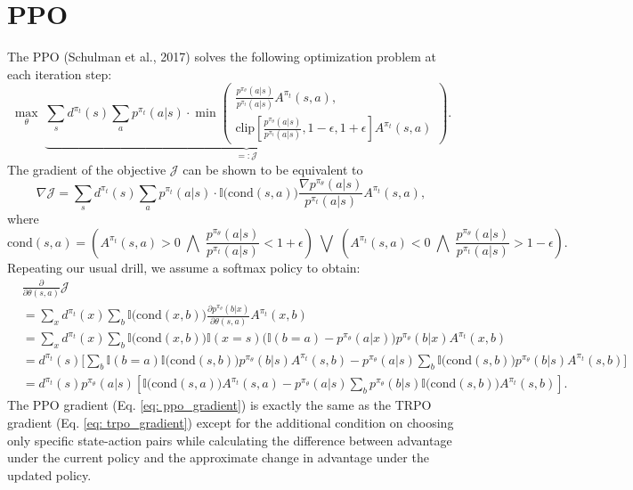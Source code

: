 \documentclass[a4paper, 10pt]{article}
\begin{document}
\section{PPO}
The PPO (Schulman et al., 2017) solves the following optimization problem at each iteration step:
\begin{equation}
  \max_\theta \; \underbrace{\sum_s d^{\pi_t}(s) \sum_a p^{\pi_t}(a | s) \cdot \min \left( \begin{matrix} \frac{p^{\pi_\theta}(a | s)}{p^{\pi_t}(a | s)} A^{\pi_t}(s, a), \\ \text{clip} \left[\frac{p^{\pi_\theta}(a | s)}{p^{\pi_t}(a | s)}, 1 - \epsilon, 1 + \epsilon \right] A^{\pi_t}(s, a) \end{matrix} \right)}_{=: \mathcal{J}}.
\end{equation}
The gradient of the objective $\mathcal{J}$ can be shown to be equivalent to
\begin{equation}
  \nabla \mathcal{J} = \sum_s d^{\pi_t}(s) \sum_a p^{\pi_t}(a | s) \cdot \mathbb{I} \Big( \text{cond}(s, a) \Big) \frac{\nabla p^{\pi_\theta}(a | s)}{p^{\pi_t}(a | s)} A^{\pi_t}(s, a),
\end{equation}
where 
\begin{equation}
  \text{cond}(s, a) = \left( A^{\pi_t}(s, a) > 0 \;\bigwedge\; \frac{p^{\pi_\theta}(a | s)}{p^{\pi_t}(a | s)} < 1 + \epsilon \right) \;\bigvee\; \left( A^{\pi_t}(s, a) < 0 \;\bigwedge\; \frac{p^{\pi_\theta}(a | s)}{p^{\pi_t}(a | s)} > 1 - \epsilon \right).
\end{equation}
Repeating our usual drill, we assume a softmax policy to obtain:
\begin{align}
  & \frac{\partial}{\partial \theta(s, a)} \mathcal{J} \nonumber \\
  &= \sum_x d^{\pi_t}(x) \sum_b \mathbb{I} \Big( \text{cond}(x, b) \Big) \frac{\partial p^{\pi_\theta}(b | x)}{\partial \theta(s, a)} A^{\pi_t}(x, b) \nonumber \\
  &= \sum_x d^{\pi_t}(x) \sum_b \mathbb{I} \Big( \text{cond}(x, b) \Big) \mathbb{I}(x = s) \Big( \mathbb{I}(b = a) - p^{\pi_\theta}(a | x) \Big) p^{\pi_\theta}(b | x) A^{\pi_t}(x, b) \nonumber \\
  &= d^{\pi_t}(s) \Bigg[ \sum_b \mathbb{I}(b = a) \mathbb{I} \Big( \text{cond}(s, b) \Big) p^{\pi_\theta}(b | s) A^{\pi_t}(s, b) - p^{\pi_\theta}(a | s) \sum_b \mathbb{I} \Big( \text{cond}(s, b) \Big) p^{\pi_\theta}(b | s) A^{\pi_t}(s, b) \Bigg] \nonumber \\
    &= d^{\pi_t}(s) p^{\pi_\theta}(a | s) \left[ \mathbb{I} \Big( \text{cond}(s, a) \Big) A^{\pi_t}(s, a) - p^{\pi_\theta}(a | s) \sum_b p^{\pi_\theta}(b | s) \mathbb{I} \Big( \text{cond}(s, b) \Big) A^{\pi_t}(s, b) \right]. \label{eq: ppo_gradient}
\end{align}
The PPO gradient (Eq. \ref{eq: ppo_gradient}) is exactly the same as the TRPO gradient (Eq. \ref{eq: trpo_gradient}) except for the additional condition on choosing only specific state-action pairs while calculating the difference between advantage under the current policy and the approximate change in advantage under the updated policy.
\end{document}
